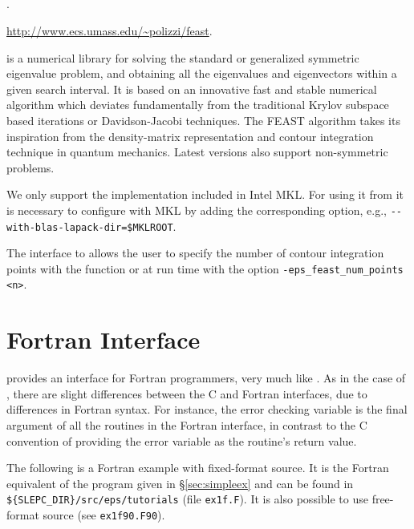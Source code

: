 \subsection*{\underline{\feast}}
	\begin{description}
	\setlength{\itemsep}{0pt}
	\item[References.]\citep{Polizzi:2009:DAS}.
	\item[Website.] \url{http://www.ecs.umass.edu/~polizzi/feast}.
	\item[Summary.] \feast is a numerical library for solving the standard or generalized symmetric eigenvalue problem, and obtaining all the eigenvalues and eigenvectors within a given search interval. It is based on an innovative fast and stable numerical algorithm which deviates fundamentally from the traditional Krylov subspace based iterations or Davidson-Jacobi techniques. The FEAST algorithm takes its inspiration from the density-matrix representation and contour integration technique in quantum mechanics. Latest versions also support non-symmetric problems.
	\item[Installation.] We only support the \feast implementation included in Intel MKL. For using it from \slepc it is necessary to configure \petsc with MKL by adding the corresponding option, e.g., \Verb!--with-blas-lapack-dir=$MKLROOT!.
	\item[Specific options.] The \slepc interface to \feast allows the user to specify the number of contour integration points with the function  or at run time with the option \Verb!-eps_feast_num_points <n>!.
	\end{description}

\section{Fortran Interface}
\label{sec:fortran}

	\slepc provides an interface for Fortran programmers, very much like \petsc. As in the case of \petsc, there are slight differences between the C and Fortran \slepc interfaces, due to differences in Fortran syntax. For instance, the error checking variable is the final argument of all the routines in the Fortran interface, in contrast to the C convention of providing the error variable as the routine's return value.

	The following is a Fortran example with fixed-format source. It is the Fortran equivalent of the program given in \S\ref{sec:simpleex} and can be found in \Verb!${SLEPC_DIR}/src/eps/tutorials! (file \texttt{ex1f.F}). It is also possible to use free-format source (see \texttt{ex1f90.F90}).

